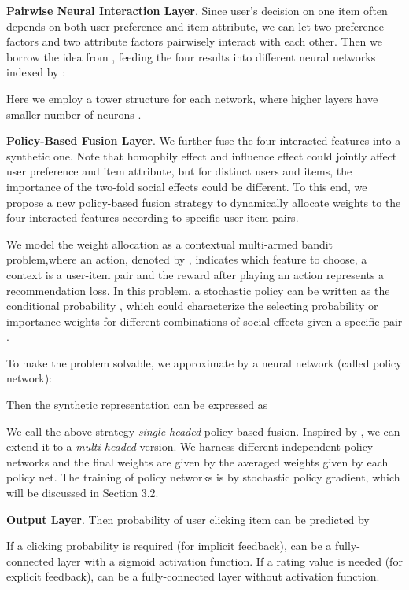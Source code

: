 \documentclass[sigconf]{acmart}
\begin{document}
\textbf{Pairwise Neural Interaction Layer}. Since user's decision on one item often depends on both user preference and item attribute, we can let two preference factors and two attribute factors pairwisely interact with each other. Then we borrow the idea from \cite{NCF}, feeding the four results into different neural networks indexed by :



Here we employ
a tower structure for each network, where higher layers have
smaller number of neurons \cite{NCF}. 

\textbf{Policy-Based Fusion Layer}. 
We further fuse the four interacted features  into a synthetic one. Note that homophily effect and influence effect could jointly affect user preference and item attribute, but for distinct users and items, the importance of the two-fold social effects could be different. 
To this end, we propose a new policy-based fusion strategy to dynamically allocate  weights to the four interacted features according to specific user-item pairs.

We model the weight allocation as a contextual multi-armed bandit problem\cite{Multi-armed},where an action, denoted by , indicates which feature to choose, a context is a user-item pair and the reward after playing an action represents a recommendation loss. In this problem, a stochastic policy can be written as the conditional probability , which could characterize the selecting probability or importance weights for different combinations of social effects given a specific pair .

To make the problem solvable, we approximate  by a neural network (called policy network):


Then the synthetic representation can be expressed as

We call the above strategy {\it single-headed} policy-based fusion. 
Inspired by \cite{AIAYN}, we can extend it to a {\it multi-headed} version. 
We harness  different independent policy networks and the final weights are given by the averaged weights given by each policy net. The training of policy networks is by stochastic policy gradient, which will be discussed in Section 3.2.

\textbf{Output Layer}. Then probability of user  clicking item  can be predicted by

If a clicking probability is required (for implicit feedback),  can be a fully-connected layer with a sigmoid activation function. 
If a rating value is needed (for explicit feedback),  can be a fully-connected layer without activation function. 
\end{document}
